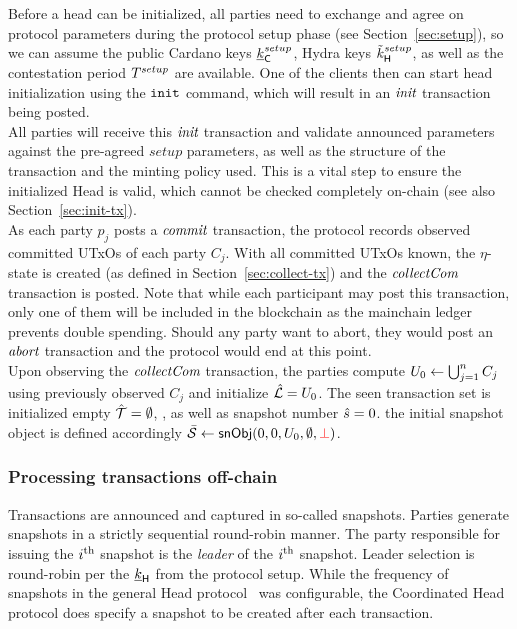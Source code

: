 \quad Before a head can be initialized, all parties need
to exchange and agree on protocol parameters during the protocol setup phase
(see Section~\ref{sec:setup}), so we can assume the public Cardano keys
$\underline{k}_\mathsf{C}^{setup}$, Hydra keys $\tilde{k}_{\mathsf{H}}^{setup}$, as well as the
contestation period $T^{setup}$ are available. One of the clients then can
start head initialization using the $\mathtt{init}$ command, which will result in an
$\textit{init}$ transaction being posted. \\

\quad All parties will receive this $\textit{init}$
transaction and validate announced parameters against the pre-agreed $setup$
parameters, as well as the structure of the transaction and the minting policy
used. This is a vital step to ensure the initialized Head is valid, which
cannot be checked completely on-chain (see also Section~\ref{sec:init-tx}). \\

\quad As each party $p_{j}$ posts a
$\textit{commit}$ transaction, the protocol records observed committed UTxOs of each
party $C_j$. With all committed UTxOs known, the $\eta$-state is created (as
defined in Section~\ref{sec:collect-tx}) and the $\textit{collectCom}$ transaction is
posted. Note that while each participant may post this transaction, only one of
them will be included in the blockchain as the mainchain ledger prevents double
spending. Should any party want to abort, they would post an $\textit{abort}$
transaction and the protocol would end at this point.\\

\quad Upon observing the $\textit{collectCom}$
transaction, the parties compute $U_{0} \gets \bigcup_{j=1}^{n} C_j$ using previously
observed $C_j$ and initialize $\hat {\mathcal L} = U_{0}$. The seen transaction set is
initialized empty $\hat {\mathcal T} = \emptyset$, , as
well as snapshot number $\hat s = 0$.  the initial snapshot object is defined accordingly
$\bar{\mathcal S} \gets \mathsf{snObj}(0, 0, U_{0}, \emptyset, \textcolor{red}{\bot})$.

\subsubsection{Processing transactions off-chain}

Transactions are announced and captured in so-called snapshots. Parties generate
snapshots in a strictly sequential round-robin manner. The party responsible for
issuing the $i^{\text{th}}$ snapshot is the \emph{leader} of the $i^{\text{th}}$ snapshot.
Leader selection is round-robin per the $\underline{k}_{\mathsf{H}}$ from the protocol setup.
While the frequency of snapshots in the general Head protocol~\cite{hydrahead20}
was configurable, the Coordinated Head protocol does specify a snapshot to be
created after each transaction.\\

